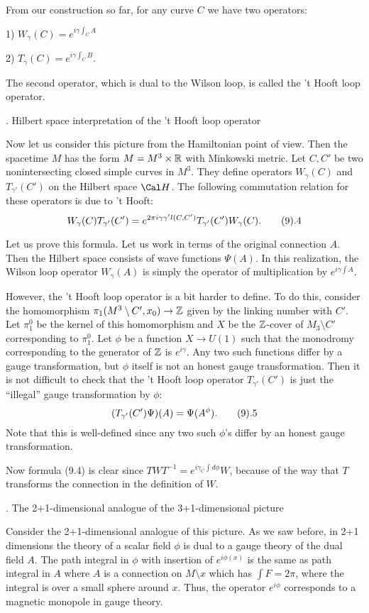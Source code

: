  From our construction so far, for any curve $C$ we have two operators: 

1) $W_\gamma(C)=e^{i\gamma\int_CA}$

2) $T_\gamma(C)=e^{i\gamma\int_CB}$.


The second operator, which is dual to the Wilson loop, is called 
the 't Hooft loop operator.  

. Hilbert space interpretation of the 't 
Hooft loop operator
\endhead

Now let us consider this picture from the Hamiltonian point of view. 
Then the spacetime $M$ has the form $M=M^3\times \Bbb R$ with Minkowski 
metric. Let $C,C'$ be two nonintersecting closed simple 
 curves in $M^3$. They define operators 
$W_\gamma(C)$ and $T_{\gamma'}(C')$ on the Hilbert space $\Cal H$. 
The following commutation relation for these operators is due to 
't Hooft:
$$
W_\gamma(C)T_{\gamma'}(C')=e^{2\pi i\gamma\gamma'l(C,C')}
T_{\gamma'}(C')W_\gamma(C).\tag 9.4
$$

Let us prove this formula. Let us work in terms of the original connection
$A$. Then the Hilbert space consists of wave functions $\Psi(A)$. 
In this realization, the Wilson loop operator 
 $W_\gamma(A)$ is simply the operator of multiplication by
$e^{i\gamma\int A}$. 

However, the 't Hooft loop operator is 
a bit harder to define. To do this, 
consider the homomorphism $\pi_1(M^3\setminus 
C',x_0)\to\Bbb Z$ given by the linking 
number with $C'$. Let $\pi_1^0$ be the kernel of this homomorphism 
and $X$ be the $\Bbb Z$-cover of $M_3\setminus C'$ corresponding to 
$\pi_1^0$. Let $\phi$ be a 
function $X\to U(1)$ such that the monodromy corresponding to 
the generator of $\Bbb Z$ is $e^{i\gamma}$. Any two such functions 
differ by a gauge transformation, but $\phi$ itself is not an honest gauge 
transformation. Then it is not difficult to check that the 't Hooft loop 
operator $T_{\gamma'}(C')$ is just the ``illegal'' gauge transformation 
by $\phi$: 
$$
(T_{\gamma'}(C')\Psi)(A)=\Psi(A^{\phi}).\tag 9.5
$$ 
Note that this is well-defined since any two such $\phi$'s differ by an 
honest gauge transformation. 

Now formula (9.4) is clear since $TWT^{-1}=e^{i\gamma_{C}\int d\phi}W$,
because of the way that $T$ transforms the connection in the definition of
$W$.

. The 2+1-dimensional analogue of the 3+1-dimensional picture
\endhead

Consider the 2+1-dimensional analogue of this picture. As we saw before, 
in 2+1 dimensions the theory of a scalar field $\phi$ is dual to a gauge 
theory of the dual field $A$. The path integral in $\phi$ with 
insertion of $e^{i\phi(x)}$ is the same as path integral in $A$ where $A$ is 
a connection on $M\setminus x$ which has $\int F=2\pi$, where the 
integral is over a small sphere around $x$. Thus, the operator 
$e^{i\phi}$ corresponds to a magnetic monopole in gauge theory. 

